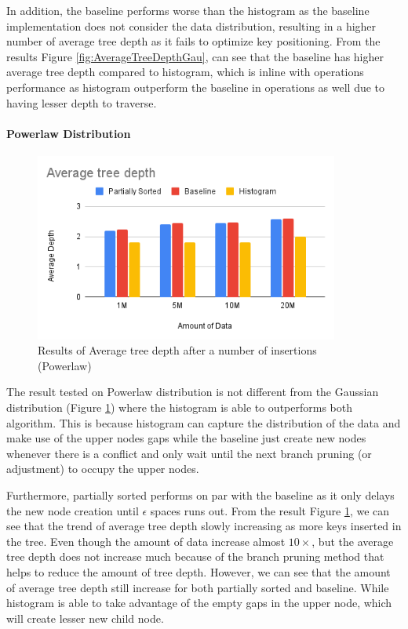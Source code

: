 \documentclass[11pt,a4paper]{article}
\newcommand{\conflict}{\textsf{conflict}\xspace}
\begin{document}
In addition, the baseline performs worse than the histogram as the baseline implementation does not consider the data distribution, resulting in a higher number of average tree depth as it fails to optimize key positioning. From the results Figure \ref{fig:AverageTreeDepthGau}, can see that the baseline has higher average tree depth compared to histogram, which is inline with operations performance as histogram outperform the baseline in operations as well due to having lesser depth to traverse.



\paragraph{Powerlaw Distribution}
\begin{figure}
    \centering
    \includegraphics[width=100mm,scale=1]{Figures/AVGTD-Pow.png}
    \caption{
     Results of Average tree depth after a number of insertions (Powerlaw)
    }
    \label{fig:AverageTreeDepthPow}
\end{figure}
The result tested on Powerlaw distribution is not different from the Gaussian distribution (Figure \ref{fig:AverageTreeDepthPow}) where the histogram is able to outperforms both algorithm. This is because histogram can capture the distribution of the data and make use of the upper nodes gaps while the baseline just create new nodes whenever there is a \conflict and only wait until the next branch pruning (or adjustment) to occupy the upper nodes. 

Furthermore, partially sorted performs on par with the baseline as it only delays the new node creation until $\epsilon$ spaces runs out. From the result Figure \ref{fig:AverageTreeDepthPow}, we can see that the trend of average tree depth slowly increasing as more keys inserted in the tree. Even though the amount of data increase almost $10\times$, but the average tree depth does not increase much because of the branch pruning method that helps to reduce the amount of tree depth. However, we can see that the amount of average tree depth still increase for both partially sorted and baseline. While histogram is able to take advantage of the empty gaps in the upper node, which will create lesser new child node.
\end{document}
